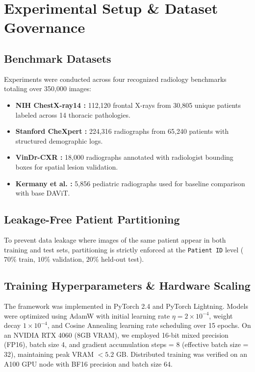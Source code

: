 \documentclass[conference]{IEEEtran}
\begin{document}
\section{Experimental Setup \& Dataset Governance}
\subsection{Benchmark Datasets}
Experiments were conducted across four recognized radiology benchmarks totaling over 350,000 images:
\begin{itemize}
    \item \textbf{NIH ChestX-ray14 \cite{wang2017}:} 112,120 frontal X-rays from 30,805 unique patients labeled across 14 thoracic pathologies.
    \item \textbf{Stanford CheXpert \cite{irvin2019}:} 224,316 radiographs from 65,240 patients with structured demographic logs.
    \item \textbf{VinDr-CXR \cite{nguyen2022}:} 18,000 radiographs annotated with radiologist bounding boxes for spatial lesion validation.
    \item \textbf{Kermany et al. \cite{kermany2018}:} 5,856 pediatric radiographs used for baseline comparison with base DAViT.
\end{itemize}

\subsection{Leakage-Free Patient Partitioning}
To prevent data leakage where images of the same patient appear in both training and test sets, partitioning is strictly enforced at the \texttt{Patient ID} level ($70\%$ train, $10\%$ validation, $20\%$ held-out test).

\subsection{Training Hyperparameters \& Hardware Scaling}
The framework was implemented in PyTorch 2.4 and PyTorch Lightning. Models were optimized using AdamW with initial learning rate $\eta=2 \times 10^{-4}$, weight decay $1 \times 10^{-4}$, and Cosine Annealing learning rate scheduling over 15 epochs. On an NVIDIA RTX 4060 (8GB VRAM), we employed 16-bit mixed precision (FP16), batch size 4, and gradient accumulation steps = 8 (effective batch size = 32), maintaining peak VRAM $< 5.2\text{ GB}$. Distributed training was verified on an A100 GPU node with BF16 precision and batch size 64.
\end{document}
